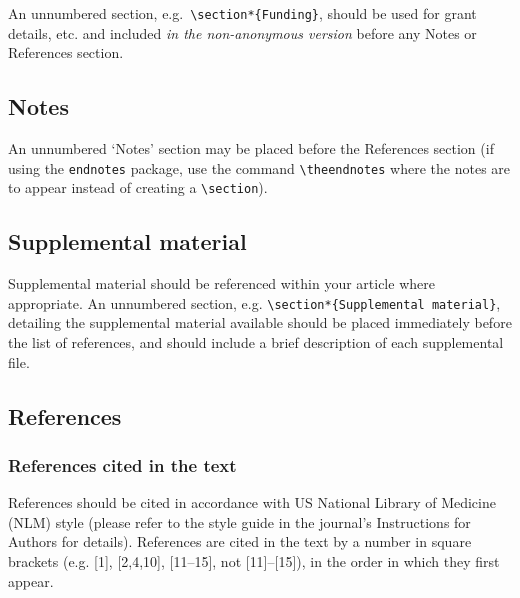 \documentclass{gCOV2e}
\theoremstyle{plain}%
\theoremstyle{definition}
\theoremstyle{remark}
\begin{document}
An unnumbered section, e.g.\ \verb"\section*{Funding}", should be used for grant details, etc.
and included \emph{in the non-anonymous version} before any Notes or References section.


\subsection{Notes}

An unnumbered `Notes' section may be placed before the References section (if using the \verb"endnotes" package, use the command \verb"\theendnotes" where the notes are to appear instead of creating a \verb"\section").


\subsection{Supplemental material}

Supplemental material should be referenced within your article where appropriate. An unnumbered section, e.g. \verb"\section*{Supplemental material}", detailing the supplemental material available should be placed immediately before the list of references, and should include a brief description of each supplemental file.


\subsection{References}\label{refs}

\subsubsection{References cited in the text}

References should be cited in accordance with US National Library of Medicine (NLM) style (please refer to the style guide in the journal's Instructions for Authors for details). References are cited in the text by a number in square brackets (e.g. [1], [2,4,10], [11--15], not [11]--[15]), in the order in which they first appear.
\end{document}
